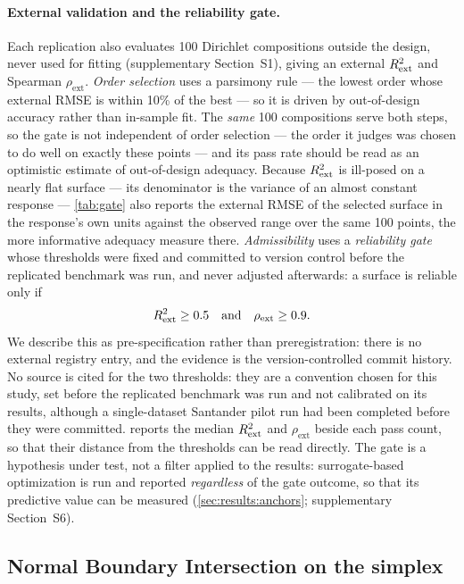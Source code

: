 \paragraph{External validation and the reliability gate.} Each replication also evaluates 100 Dirichlet compositions
outside the design, never used for fitting (supplementary Section~S1), giving an external $R^{2}_{\mathrm{ext}}$ and Spearman
$\rho_{\mathrm{ext}}$. \emph{Order selection} uses a parsimony rule --- the
lowest order whose external RMSE is within 10\% of the best --- so it is driven by out-of-design accuracy rather than
in-sample fit. The \emph{same} 100 compositions serve both steps, so the gate is not independent of order selection
--- the order it judges was chosen to do well on exactly these points --- and its pass rate should be read as an
optimistic estimate of out-of-design adequacy. Because $R^{2}_{\mathrm{ext}}$ is ill-posed on a nearly flat surface --- its
denominator is the variance of an almost constant response --- \cref{tab:gate} also reports the external RMSE of the
selected surface in the response's own units against the observed range over the same 100 points, the more
informative adequacy measure there. \emph{Admissibility} uses a \emph{reliability gate} whose thresholds
were fixed and committed to version control before the replicated benchmark was run, and never adjusted afterwards: a
surface is reliable only if
\begin{equation}
R^{2}_{\mathrm{ext}} \ge 0.5 \quad\text{and}\quad \rho_{\mathrm{ext}} \ge 0.9 .
\label{eq:gate}
\end{equation}
We describe this as pre-specification rather than preregistration: there is no
external registry entry, and the evidence is the version-controlled commit history. No source is cited for the two
thresholds: they are a convention chosen for this study, set before the replicated benchmark was run and not
calibrated on its results, although a single-dataset Santander pilot run had been completed before they were
committed.  reports the median $R^{2}_{\mathrm{ext}}$ and $\rho_{\mathrm{ext}}$ beside each pass
count, so that their distance from the thresholds can be read directly. The gate is a hypothesis under
test, not a filter applied to the results: surrogate-based optimization is run and reported \emph{regardless} of the
gate outcome, so that its predictive value can be measured (\cref{sec:results:anchors}; supplementary Section~S6).

\subsection{Normal Boundary Intersection on the simplex}
\label{sec:method:nbi}

